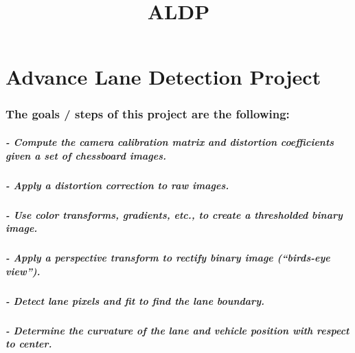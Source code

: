 \documentclass[11pt]{article}
\title{ALDP}
\begin{document}
    
    
    \maketitle
    
    

    
    \hypertarget{advance-lane-detection-project}{%
\section{Advance Lane Detection
Project}\label{advance-lane-detection-project}}

    \hypertarget{the-goals-steps-of-this-project-are-the-following}{%
\subsubsection{The goals / steps of this project are the
following:}\label{the-goals-steps-of-this-project-are-the-following}}

\hypertarget{compute-the-camera-calibration-matrix-and-distortion-coefficients-given-a-set-of-chessboard-images.}{%
\subparagraph{- Compute the camera calibration matrix and distortion
coefficients given a set of chessboard
images.}\label{compute-the-camera-calibration-matrix-and-distortion-coefficients-given-a-set-of-chessboard-images.}}

\hypertarget{apply-a-distortion-correction-to-raw-images.}{%
\subparagraph{- Apply a distortion correction to raw
images.}\label{apply-a-distortion-correction-to-raw-images.}}

\hypertarget{use-color-transforms-gradients-etc.-to-create-a-thresholded-binary-image.}{%
\subparagraph{- Use color transforms, gradients, etc., to create a
thresholded binary
image.}\label{use-color-transforms-gradients-etc.-to-create-a-thresholded-binary-image.}}

\hypertarget{apply-a-perspective-transform-to-rectify-binary-image-birds-eye-view.}{%
\subparagraph{- Apply a perspective transform to rectify binary image
(``birds-eye
view'').}\label{apply-a-perspective-transform-to-rectify-binary-image-birds-eye-view.}}

\hypertarget{detect-lane-pixels-and-fit-to-find-the-lane-boundary.}{%
\subparagraph{- Detect lane pixels and fit to find the lane
boundary.}\label{detect-lane-pixels-and-fit-to-find-the-lane-boundary.}}

\hypertarget{determine-the-curvature-of-the-lane-and-vehicle-position-with-respect-to-center.}{%
\subparagraph{- Determine the curvature of the lane and vehicle position
with respect to
center.}\label{determine-the-curvature-of-the-lane-and-vehicle-position-with-respect-to-center.}}
\end{document}
